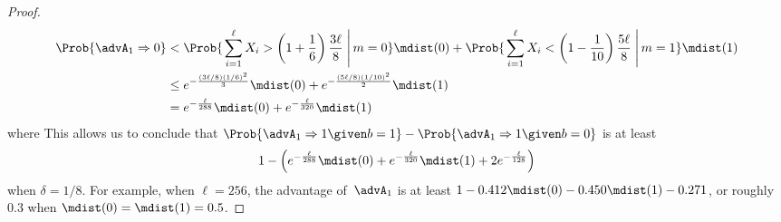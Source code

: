 \begin{proof}
\begin{align*}
\Prob{\advA_1 \Rightarrow 0}  < &\; \Prob{\left. \sum_{i=1}^{\ell} X_i > \left(1+\frac{1}{6}\right)\frac{3\ell}{8} \;\right| m=0}\mdist(0) 
+ \Prob{\left. \sum_{i=1}^{\ell} X_i < \left(1-\frac{1}{10}\right)\frac{5\ell}{8} \;\right| m=1 }\mdist(1)\\
\leq &\; e^{-\frac{(3\ell/8)(1/6)^2}{3}}\mdist(0) + e^{-\frac{(5\ell/8)(1/10)^2}{2}}\mdist(1) \\
=&\; e^{-\frac{\ell}{288}}\mdist(0) + e^{-\frac{\ell}{320}}\mdist(1)
\end{align*}
where 
This allows us to conclude that $\Prob{\advA_1 \Rightarrow 1 \given b=1} - \Prob{\advA_1 \Rightarrow 1 \given b=0}$ is at least \[
1- \left(e^{-\frac{\ell}{288}}\mdist(0) + e^{-\frac{\ell}{320}}\mdist(1) + 2e^{-\frac{\ell}{128}} \right)
\] 
when $\delta=1/8$.  For example, when $\ell=256$, the advantage of~$\advA_1$ is at least $1-0.412\mdist(0)-0.450\mdist(1)-0.271$, or roughly $0.3$ when $\mdist(0)=\mdist(1)=0.5$.
\end{proof}

